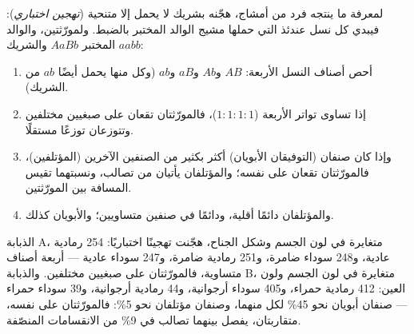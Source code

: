 \begin{method}\label{met:g12:meiosis-genetic-shuffling:testcross}
لمعرفة ما ينتجه فرد من أمشاج، هجّنه بشريك لا يحمل إلا  متنحية
(\emph{تهجين اختباري}): فيبدي كل نسل عندئذ  التي حملها مشيج
الوالد المختبر بالضبط. ولمورّثتين، والوالد المختبر $AaBb$ والشريك
$aabb$:
\begin{enumerate}
  \item أحص أصناف النسل الأربعة: $AB$ و$Ab$ و$aB$ و$ab$ (وكل منها يحمل
        أيضًا $ab$ من الشريك).
  \item إذا تساوى تواتر الأربعة ($1:1:1:1$)، فالمورّثتان تقعان على
        صبغيين مختلفين وتتوزعان توزعًا مستقلًا.
  \item وإذا كان صنفان (التوفيقان الأبويان) أكثر بكثير من الصنفين
        الآخرين (المؤتلفين)، فالمورّثتان تقعان على  نفسه؛
        والمؤتلفان يأتيان من تصالب، ونسبتهما تقيس المسافة بين
        المورّثتين.
  \item والمؤتلفان دائمًا أقلية، ودائمًا في صنفين متساويين؛ والأبويان
        كذلك.
\end{enumerate}
\end{method}

\begin{example}\label{ex:g12:meiosis-genetic-shuffling:fly}
الذبابة A، متغايرة  في لون الجسم وشكل الجناح، هجّنت تهجينًا
اختباريًا: 254 رمادية عادية، و248 سوداء ضامرة، و251 رمادية ضامرة، و247
سوداء عادية --- أربعة أصناف متساوية، فالمورّثتان على صبغيين مختلفين.
والذبابة B، متغايرة  في لون الجسم ولون العين: 412 رمادية
حمراء، و405 سوداء أرجوانية، و44 رمادية أرجوانية، و39 سوداء حمراء ---
صنفان أبويان نحو 45\% لكل منهما، وصنفان مؤتلفان نحو 5\%: فالمورّثتان
على  نفسه، متقاربتان، يفصل بينهما تصالب في 9\% من الانقسامات
المنصّفة.
\end{example}

